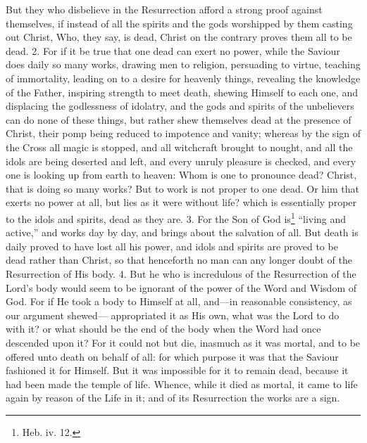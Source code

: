 But they who disbelieve in the Resurrection afford a strong proof against themselves, if instead of all the spirits and the gods worshipped by them casting out Christ, Who, they say, is dead, Christ on the contrary proves them all to be dead. 2. For if it be true that one dead can exert no power, while the Saviour does daily so many works, drawing men to religion, persuading to virtue, teaching of immortality, leading on to a desire for heavenly things, revealing the knowledge of the Father, inspiring strength to meet death, shewing Himself to each one, and displacing the godlessness of idolatry, and the gods and spirits of the unbelievers can do none of these things, but rather shew themselves dead at the presence of Christ, their pomp being reduced to impotence and vanity; whereas by the sign of the Cross all magic is stopped, and all witchcraft brought to nought, and all the idols are being deserted and left, and every unruly pleasure is checked, and every one is looking up from earth to heaven: Whom is one to pronounce dead? Christ, that is doing so many works? But to work is not proper to one dead. Or him that exerts no power at all, but lies as it were without life? which is essentially proper to the idols and spirits, dead as they are. 3. For the Son of God is\footnote{Heb. iv. 12.} “living and active,” and works day by day, and brings about the salvation of all. But death is daily proved to have lost all his power, and idols and spirits are proved to be dead rather than Christ, so that henceforth no man can any longer doubt of the Resurrection of His body. 4. But he who is incredulous of the Resurrection of the Lord’s body would seem to be ignorant of the power of the Word and Wisdom of God. For if He took a body to Himself at all, and—in reasonable consistency, as our argument shewed— appropriated it as His own, what was the Lord to do with it? or what should be the end of the body when the Word had once descended upon it? For it could not but die, inasmuch as it was mortal, and to be offered unto death on behalf of all: for which purpose it was that the Saviour fashioned it for Himself. But it was impossible for it to remain dead, because it had been made the temple of life. Whence, while it died as mortal, it came to life again by reason of the Life in it; and of its Resurrection the works are a sign.


